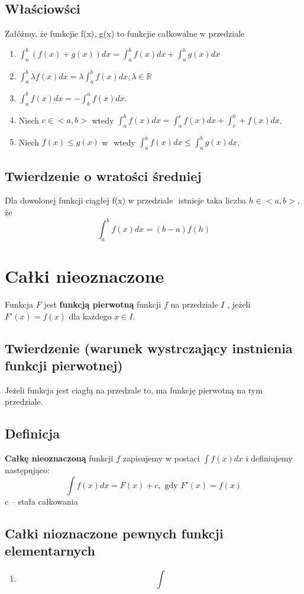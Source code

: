 \documentclass[11pt]{article}
\begin{document}
\subsection{Właściowści}
\label{sec:org114fa90}
Załóżmy, że funkcjie f(x), g(x) to funkcjie całkowalne w przedziale \(<a,b>\)
\begin{enumerate}
\item \(\displaystyle\int_a^b( f(x) + g(x) )dx
   = \int_a^b f(x) dx + \int_a^b g(x)dx\)
\item \(\displaystyle \int_a^b \lambda f(x) dx = \lambda \int_a^b f(x)dx, \lambda \in \mathbb{R}\)
\item \(\displaystyle \int_a^b f(x) dx = - \int_b^a f(x) dx\).
\item Niech \(c \in <a,b>\) wtedy \(\displaystyle \int_a^b f(x)dx = \int_a^c f(x)dx + \int_c^b+f(x)dx\).
\item Niech \(f(x) \le g(x)\) w \(<a, b>\) wtedy \(\displaystyle \int_a^b f(x)dx \le \int_a^b g(x)dx\).
\end{enumerate}
\subsection{Twierdzenie o wratości średniej}
\label{sec:org1436705}
Dla dowolonej funkcji ciągłej f(x) w przedziale \(<a,b>\) istnieje taka liczba \(h \in <a,b>\), że
$$\int_a^b f(x)dx = (b-a)f(h)$$
\newpage
\section{Całki nieoznaczone}
\label{sec:org4825044}
Funkcja \(F\) jest \textbf{funkcją pierwotną} funkcji \(f\) na przedziale \(I\) , jeżeli \(F'(x) = f(x)\) dla każdego \(x \in I\).
\subsection{Twierdzenie (warunek wystrczający instnienia funkcji pierwotnej)}
\label{sec:org99fab2c}
Jeżeli funkcja jest ciagłą na przedzale to, ma funkcję pierwotną na tym przedziale.
\subsection{Definicja}
\label{sec:orga18286d}
\textbf{Całkę nieoznaczoną} funkcji \(f\) zapisujemy w postaci \(\int f(x)dx\) i definiujemy następująco:
$$\int f(x) dx = F(x) + c, \text{ gdy }F'(x) = f(x)$$
\(c\) -- stała całkowania
\subsection{Całki nioznaczone pewnych funkcji elementarnych}
\label{sec:orge189057}
\begin{enumerate}
\item \[\int\]
\end{enumerate}
\end{document}
